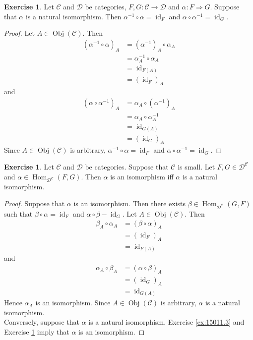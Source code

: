 \documentclass[12pt]{amsart}
\theoremstyle{definition}
\newtheorem{ex}[definition]{Exercise}
\newcommand{\al}{\alpha}
\newcommand{\be}{\beta}
\newcommand{\MC}{\mathcal{C}}
\newcommand{\MD}{\mathcal{D}}
\DeclareMathOperator{\id}{id}
\DeclareMathOperator{\Obj}{Obj}
\DeclareMathOperator{\Hom}{Hom}
\DeclareMathOperator*{\0}{\mbf{0}}
\DeclareMathOperator*{\1}{\mbf{1}}
\newcommand{\lex}[1]{\label{ex:#1}}
\newcommand{\rex}[1]{Exercise \ref{ex:#1}}
\begin{document}
	\begin{ex} \lex{15011.4}
		Let $\MC$ and $\MD$ be categories, $F,G: \MC \rightarrow \MD$ and $\al : F \Rightarrow G$. Suppose that $\al$ is a natural isomorphism. Then $\al^{-1} \circ \al = \id_{F}$ and $\al \circ \al^{-1} = \id_G$.
	\end{ex}

	\begin{proof}
		Let $A \in \Obj(\MC)$. Then 
		\begin{align*}
			(\al^{-1} \circ \al )_A 
			& = (\al^{-1})_A \circ \al_A \\
			& = \al_A^{-1} \circ \al_A \\
			& = \id_{F(A)} \\
			& = (\id_F)_A
		\end{align*}
		and 
			\begin{align*}
			(\al \circ \al^{-1} )_A 
			& = \al_A \circ (\al^{-1})_A\\
			& = \al_A \circ \al_A^{-1}\\
			& = \id_{G(A)} \\
			& = (\id_G)_A
		\end{align*}
		Since $A \in \Obj(\MC)$ is arbitrary, $\al^{-1} \circ \al = \id_F$ and $\al \circ \al^{-1} = \id_G$.
	\end{proof}

	\begin{ex} \lex{15011.5}
		Let $\MC$ and $\MD$ be categories. Suppose that $\MC$ is small. Let $F,G \in \MD^{\MC}$ and $\al \in \Hom_{\MD^{\MC}}(F, G)$. Then $\al$ is an isomorphism iff $\al$ is a natural isomorphism.  
	\end{ex}

	\begin{proof}
		Suppose that $\al$ is an isomorphism. Then there exists $\be \in \Hom_{\MD^{\MC}}(G, F)$ such that $\be \circ \al = \id_F$ and $\al \circ \be - \id_G$. Let $A \in \Obj(\MC)$. Then
		\begin{align*}
			\be_A \circ \al_A 
			& = (\be \circ \al)_A \\
			& = (\id_F)_A \\
			& = \id_{F(A)}
		\end{align*}
		and 
		\begin{align*}
			\al_A \circ \be_A
			& = (\al \circ \be)_A \\
			& = (\id_G)_A \\
			& = \id_{G(A)}
		\end{align*}
		Hence $\al_A$ is an isomorphism. Since $A \in \Obj(\MC)$ is arbitrary, $\al$ is a natural isomorphism. \\
		Conversely, suppose that $\al$ is a natural isomorphism. \rex{15011.3} and \rex{15011.4} imply that $\al$ is an isomorphism.
	\end{proof}
\end{document}
